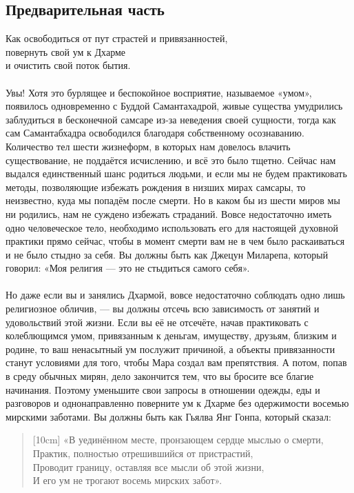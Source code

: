 \subsection{Предварительная часть}
\large Как освободиться от пут страстей и привязанностей,\\
повернуть свой ум к Дхарме \\
и очистить свой поток бытия.\normalsize
\\
\\
Увы! Хотя это бурлящее и беспокойное восприятие, называе\-мое «умом»,
появилось одновременно с Буддой Самантахад\-рой, живые существа
умудрились заблудиться в бесконечной самсаре из-за неведения своей
сущности, тогда как сам Самантабхадра освободился благодаря
собственному осознаванию. Количество тел шести жизнеформ,
в которых нам довелось влачить существование, не поддаётся
исчислению, и всё это было тщетно. Сейчас нам выдался единственный
шанс родить\-ся людьми, и если мы не будем практиковать методы,
позволяющие избежать рождения в низших мирах самсары, то неизвест\-но,
куда мы попадём после смерти. Но в каком бы из шести миров мы ни родились,
нам не суждено избежать страданий. Вовсе недостаточно иметь одно
человеческое тело, необходимо использовать его для настоящей духовной
практики прямо сейчас, чтобы в момент смерти вам не в чем было
раскаиваться и не было стыдно за себя. Вы должны быть как Джецун
Миларепа, который говорил: «Моя религия — это не стыдиться самого себя».
\\ \\ Но даже если вы и занялись Дхармой, вовсе недостаточно соблюдать
одно лишь религиозное обличив, — вы должны отсечь всю зависимость от
занятий и удовольствий этой жизни. Если вы её не отсечёте, начав
практиковать с колеблющимся умом, привязанным к деньгам, имуществу,
друзьям, близким и родине, то ваш ненасытный ум послужит причиной,
а объекты привязанности станут условиями для того, чтобы Мара создал
вам препятствия. А потом, попав в среду обычных мирян, дело закончится
тем, что вы бросите все благие начинания. Поэтому уменьшите свои
запросы в отношении одежды, еды и разговоров и однонаправленно
поверните ум к Дхарме без одержимости восемью мирскими заботами. Вы должны быть как Гьялва Янг Гонпа, который сказал:
\newpage
\begin{verse}[10cm]
«В уединённом месте, пронзающем сердце мыслью о смерти, \\
Практик, полностью отрешившийся от пристрастий, \\
Проводит границу, оставляя все мысли об этой жизни, \\
И его ум не трогают восемь мирских забот».
\end{verse}
